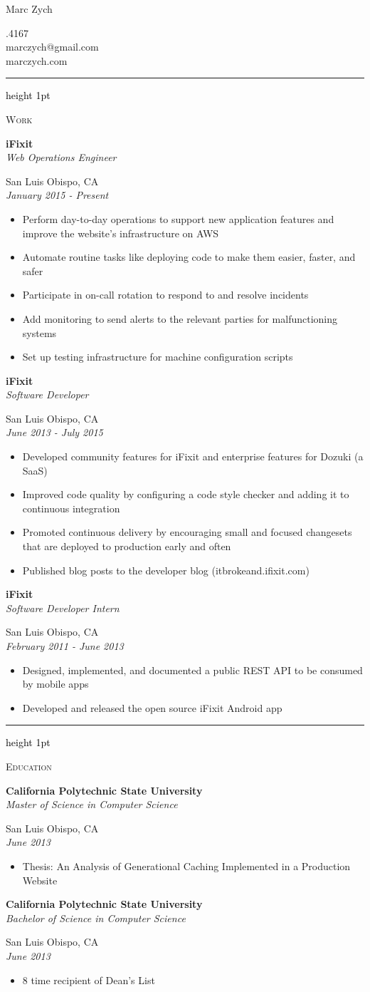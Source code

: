 \documentclass[letterpaper,10pt]{article}
\newcommand{\resauthor}[4]{
   \begin{minipage}[c]{.4\textwidth}
      \raggedright
      {\Huge #1}
   \end{minipage}
   \hfill
   \begin{minipage}[c]{.4\textwidth}
      \raggedleft
      #2\\
      #3\\
      #4
   \end{minipage}
}
\newcommand{\ressectiondivider}{
   \textcolor{black}{\hrule height 1pt}
}
\newcommand{\resitem}[1]{\item #1 \vspace{-2pt}}
\newcommand{\ressubheading}[4]{
   \begin{minipage}[t]{10cm}
      \flushleft
      \large{\textbf{#1}}\\
      \normalsize{\textit{#3}}\\
   \end{minipage}
   \hfill
   \begin{minipage}[t]{5cm}
      \flushright
      #2\\
      \textit{#4}\\
   \end{minipage}
}
\newenvironment{ressection}[1]{
   \vspace{12pt}
   \ressectiondivider
   \vspace{5pt}
   \begin{minipage}[t]{2.75cm}
      \flushleft
      \Large{\textrm{\textsc{#1}}}
   \end{minipage}
   \hfill
   \begin{minipage}[t]{16cm}
      \flushleft
}{
   \end{minipage}
}
\begin{document}
\resauthor{Marc Zych}{805.217.4167}{marczych@gmail.com}{marczych.com}

\begin{ressection}{Work}
   \ressubheading{iFixit}{San Luis Obispo, CA}{Web Operations Engineer}{January 2015 - Present}
   \begin{itemize}
      \resitem{Perform day-to-day operations to support new application features and improve the website's infrastructure on AWS}
      \resitem{Automate routine tasks like deploying code to make them easier, faster, and safer}
      \resitem{Participate in on-call rotation to respond to and resolve incidents}
      \resitem{Add monitoring to send alerts to the relevant parties for malfunctioning systems}
      \resitem{Set up testing infrastructure for machine configuration scripts}
   \end{itemize}
   \ressubheading{iFixit}{San Luis Obispo, CA}{Software Developer}{June 2013 - July 2015}
   \begin{itemize}
      \resitem{Developed community features for iFixit and enterprise features for Dozuki (a SaaS)}
      \resitem{Improved code quality by configuring a code style checker and adding it to continuous integration}
      \resitem{Promoted continuous delivery by encouraging small and focused changesets that are deployed to production early and often}
      \resitem{Published blog posts to the developer blog (itbrokeand.ifixit.com)}
   \end{itemize}
   \ressubheading{iFixit}{San Luis Obispo, CA}{Software Developer Intern}{February 2011 - June 2013}
   \begin{itemize}
      \resitem{Designed, implemented, and documented a public REST API to be consumed by mobile apps}
      \resitem{Developed and released the open source iFixit Android app}
   \end{itemize}
\end{ressection}

\begin{ressection}{Education}
   \ressubheading{California Polytechnic State University}{San Luis Obispo, CA}{Master of Science in Computer Science}{June 2013}
   \begin{itemize}
      \resitem{Thesis: An Analysis of Generational Caching Implemented in a Production Website}
   \end{itemize}
   \ressubheading{California Polytechnic State University}{San Luis Obispo, CA}{Bachelor of Science in Computer Science}{June 2013}
   \begin{itemize}
      \resitem{8 time recipient of Dean's List}
   \end{itemize}
\end{ressection}
\end{document}
